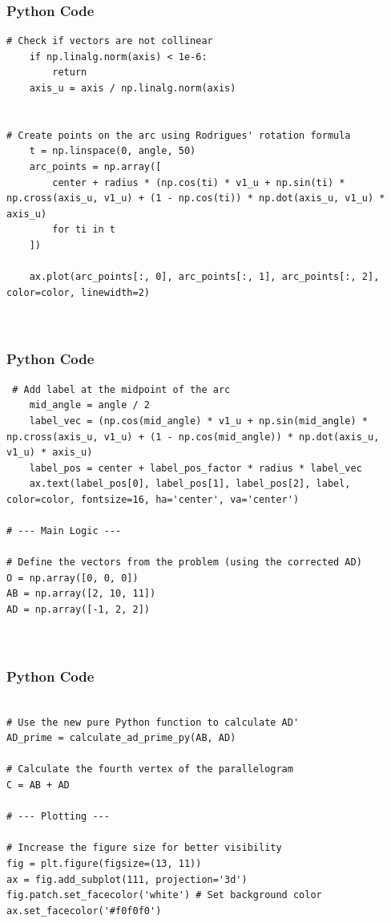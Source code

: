 \documentclass{beamer}
\begin{document}
\begin{frame}[fragile]
    \frametitle{Python Code }
    \begin{lstlisting}
# Check if vectors are not collinear
    if np.linalg.norm(axis) < 1e-6:
        return
    axis_u = axis / np.linalg.norm(axis)
    
    
# Create points on the arc using Rodrigues' rotation formula
    t = np.linspace(0, angle, 50)
    arc_points = np.array([
        center + radius * (np.cos(ti) * v1_u + np.sin(ti) * np.cross(axis_u, v1_u) + (1 - np.cos(ti)) * np.dot(axis_u, v1_u) * axis_u)
        for ti in t
    ])
    
    ax.plot(arc_points[:, 0], arc_points[:, 1], arc_points[:, 2], color=color, linewidth=2)
    
   
\end{lstlisting}
\end{frame}

\begin{frame}[fragile]
    \frametitle{Python Code }
    \begin{lstlisting}
 # Add label at the midpoint of the arc
    mid_angle = angle / 2
    label_vec = (np.cos(mid_angle) * v1_u + np.sin(mid_angle) * np.cross(axis_u, v1_u) + (1 - np.cos(mid_angle)) * np.dot(axis_u, v1_u) * axis_u)
    label_pos = center + label_pos_factor * radius * label_vec
    ax.text(label_pos[0], label_pos[1], label_pos[2], label, color=color, fontsize=16, ha='center', va='center')

# --- Main Logic ---

# Define the vectors from the problem (using the corrected AD)
O = np.array([0, 0, 0])
AB = np.array([2, 10, 11])
AD = np.array([-1, 2, 2])



\end{lstlisting}
\end{frame}

\begin{frame}[fragile]
    \frametitle{Python Code }
    \begin{lstlisting}

# Use the new pure Python function to calculate AD'
AD_prime = calculate_ad_prime_py(AB, AD)

# Calculate the fourth vertex of the parallelogram
C = AB + AD

# --- Plotting ---

# Increase the figure size for better visibility
fig = plt.figure(figsize=(13, 11))
ax = fig.add_subplot(111, projection='3d')
fig.patch.set_facecolor('white') # Set background color
ax.set_facecolor('#f0f0f0')
\end{lstlisting}
\end{frame}
\end{document}
